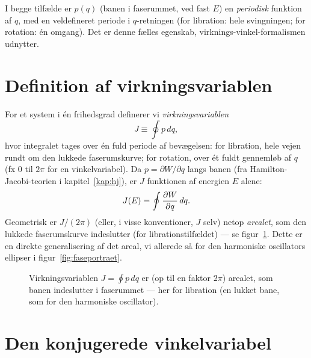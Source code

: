I begge tilfælde er $p(q)$ (banen i faserummet, ved fast $E$) en
\emph{periodisk} funktion af $q$, med en veldefineret periode i
$q$-retningen (for libration: hele svingningen; for rotation: én
omgang). Det er denne fælles egenskab, virknings-vinkel-formalismen
udnytter.

\section{Definition af virkningsvariablen}

For et system i én frihedsgrad definerer vi \emph{virkningsvariablen}
\begin{equation}
  \boxed{J \equiv \oint p\,dq,}
  \label{eq:def-J}
\end{equation}
hvor integralet tages over \'en fuld periode af bevægelsen: for
libration, hele vejen rundt om den lukkede faserumskurve; for
rotation, over ét fuldt gennemløb af $q$ (fx $0$ til $2\pi$ for en
vinkelvariabel). Da $p=\partial W/\partial q$ langs banen (fra
Hamilton-Jacobi-teorien i kapitel~\ref{kap:hj}), er $J$ funktionen af
energien $E$ alene:
\begin{equation}
  J(E) = \oint \pdv{W}{q}\,dq.
  \label{eq:J-fra-W}
\end{equation}
Geometrisk er $J/(2\pi)$ (eller, i visse konventioner, $J$ selv) netop
\emph{arealet}, som den lukkede faserumskurve indeslutter (for
librationstilfældet) — se figur~\ref{fig:virkningsareal}. Dette er en
direkte generalisering af det areal, vi allerede så for den harmoniske
oscillators ellipser i figur~\ref{fig:faseportraet}.

\begin{figure}[htbp]
  \centering
  \caption{Virkningsvariablen $J=\oint p\,dq$ er (op til en faktor
  $2\pi$) arealet, som banen indeslutter i faserummet — her for
  libration (en lukket bane, som for den harmoniske oscillator).}
  \label{fig:virkningsareal}
\end{figure}

\section{Den konjugerede vinkelvariabel}

